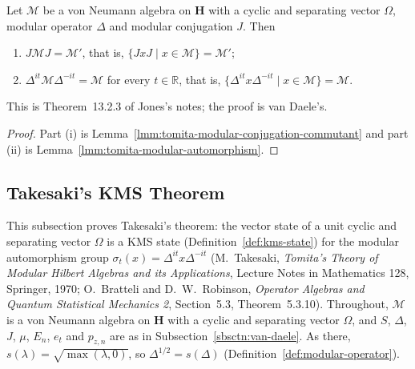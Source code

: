 \begin{theorem}
    \label{thrm:tomita}
    \leanok
    Let $\mathcal{M}$ be a von Neumann algebra on $\mathbf{H}$ with a cyclic and separating vector $\Omega$, modular operator $\Delta$ and modular conjugation $J$. Then
    \begin{enumerate}
        \item $J\mathcal{M}J = \mathcal{M}'$, that is, $\{ JxJ \mid x \in \mathcal{M} \} = \mathcal{M}'$;
        \item $\Delta^{it}\mathcal{M}\Delta^{-it} = \mathcal{M}$ for every $t \in \mathbb{R}$, that is, $\{ \Delta^{it}x\Delta^{-it} \mid x \in \mathcal{M} \} = \mathcal{M}$.
    \end{enumerate}
    This is Theorem~13.2.3 of Jones's notes; the proof is van Daele's.
\end{theorem}
\begin{proof}
    \leanok
    Part (i) is Lemma~\ref{lmm:tomita-modular-conjugation-commutant} and part (ii) is Lemma~\ref{lmm:tomita-modular-automorphism}.
\end{proof}

\subsection{Takesaki's KMS Theorem}\label{sbsctn:takesaki-kms}

This subsection proves Takesaki's theorem: the vector state of a unit cyclic and separating vector $\Omega$ is a KMS state (Definition~\ref{def:kms-state}) for the modular automorphism group $\sigma_t(x) = \Delta^{it}x\Delta^{-it}$ (M.~Takesaki, \emph{Tomita's Theory of Modular Hilbert Algebras and its Applications}, Lecture Notes in Mathematics 128, Springer, 1970; O.~Bratteli and D.~W.~Robinson, \emph{Operator Algebras and Quantum Statistical Mechanics 2}, Section~5.3, Theorem~5.3.10). Throughout, $\mathcal{M}$ is a von Neumann algebra on $\mathbf{H}$ with a cyclic and separating vector $\Omega$, and $S$, $\Delta$, $J$, $\mu$, $E_n$, $e_t$ and $p_{z,n}$ are as in Subsection~\ref{sbsctn:van-daele}. As there, $s(\lambda) = \sqrt{\max(\lambda, 0)}$, so $\Delta^{1/2} = s(\Delta)$ (Definition~\ref{def:modular-operator}).

